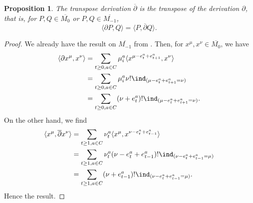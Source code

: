 \documentclass[a4paper,11pt]{article}
\newtheorem{proposition}[theorem]{Proposition}
\begin{document}
\begin{proposition}
The transpose derivation $\overline{\partial}$ is the transpose of the derivation $\partial$, that is, for $P,Q\in \overline{M_0}$ or $P,Q\in \overline{M_{-1}}$,
\[
\langle \partial P, Q\rangle=\langle P , \overline{\partial} Q \rangle.
\]
\end{proposition}


\begin{proof}
We already have the result on $\overline{M_{-1}}$ from \cite{Zhu24fna}.
Then, for $x^{\mu}, x^{\nu}\in \overline{M_0}$, we have
\begin{align*}
\langle \partial x^{\mu}, x^{\nu}\rangle & =  \sum_{t\geq 0, a\in C} \mu_i^a\langle x^{\mu - e_t^a + e_{t+1}^a}, x^{\nu} \rangle\\
& = \sum_{t\geq 0, a\in C} \mu_i^a \nu!\ind_{(\mu - e_t^a + e_{t+1}^a=\nu)}\\
& = \sum_{t\geq 0, a\in C}(\nu + e_t^a)!\ind_{(\mu - e_t^a + e_{t+1}^a=\nu)}.
\end{align*}
On the other hand, we find
\begin{align*}
\langle x^{\mu} , \overline{\partial} x^{\nu}\rangle & = \sum_{t\geq 1, a\in C}\nu_t^a\langle x^{\mu}, x^{\nu - e_t^a + e_{t-1}^a}\rangle\\
& = \sum_{t\geq 1, a\in C} \nu_t^a (\nu - e_t^a + e_{t-1}^a)!\ind_{(\nu - e_t^a + e_{t-1}^a = \mu)}\\
& = \sum_{t\geq 1, a\in C} (\nu + e_{t-1}^a)!\ind_{(\nu - e_t^a + e_{t-1}^a=\mu)}.
\end{align*}
Hence the result.
\end{proof}
\end{document}
